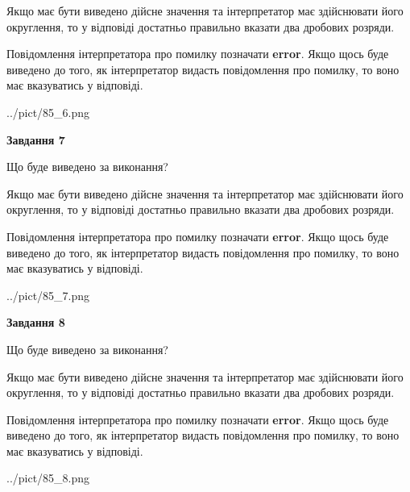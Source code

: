 \documentclass[12pt, ukrainian]{article}
\begin{document}
{\begin {Large}
Якщо має бути виведено дійсне значення та інтерпретатор має здійснювати його округлення, 
то у відповіді достатньо правильно вказати два дробових розряди.

Повідомлення інтерпретатора про помилку позначати \textbf{error}.
Якщо щось буде виведено до того, як інтерпретатор видасть повідомлення про помилку, 
то воно має вказуватись у відповіді. \par

\begin{center}
	{../pict/85_6.png}
\end{center}
\newpage

{\begin {center}\textbf{Завдання 7}\end {center}}\par
Що буде виведено за виконання? \par

Якщо має бути виведено дійсне значення та інтерпретатор має здійснювати його округлення, 
то у відповіді достатньо правильно вказати два дробових розряди.

Повідомлення інтерпретатора про помилку позначати \textbf{error}.
Якщо щось буде виведено до того, як інтерпретатор видасть повідомлення про помилку, 
то воно має вказуватись у відповіді. \par

\begin{center}
	{../pict/85_7.png}
\end{center}
\newpage

{\begin {center}\textbf{Завдання 8}\end {center}}\par
Що буде виведено за виконання? \par

Якщо має бути виведено дійсне значення та інтерпретатор має здійснювати його округлення, 
то у відповіді достатньо правильно вказати два дробових розряди.

Повідомлення інтерпретатора про помилку позначати \textbf{error}.
Якщо щось буде виведено до того, як інтерпретатор видасть повідомлення про помилку, 
то воно має вказуватись у відповіді. \par

\begin{center}
	{../pict/85_8.png}
\end{center}
\newpage


\end{Large}}
\end{document}
